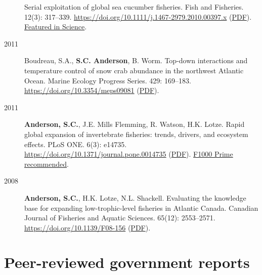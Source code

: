 \begin{description}
Serial exploitation of global sea cucumber fisheries. Fish and
Fisheries. 12(3): 317--339.
\url{https://doi.org/10.1111/j.1467-2979.2010.00397.x}
(\href{https://www.dropbox.com/s/d8id4zxe9xv6jau/Anderson_etal_2011_seacucumbers_with_supplement.pdf?dl=1}{PDF}).
\href{http://www.sciencemag.org/content/331/6014/129.1.full}{Featured in
Science}.
\item[2011]
Boudreau, S.A., \textbf{S.C. Anderson}, B. Worm. Top-down interactions
and temperature control of snow crab abundance in the northwest Atlantic
Ocean. Marine Ecology Progress Series. 429: 169--183.
\url{https://doi.org/10.3354/meps09081}
(\href{http://www.int-res.com/articles/meps_oa/m429p169.pdf}{PDF}).
\item[2011]
\textbf{Anderson, S.C.}, J.E. Mills Flemming, R. Watson, H.K. Lotze.
Rapid global expansion of invertebrate fisheries: trends, drivers, and
ecosystem effects. PLoS ONE. 6(3): e14735.
\url{https://doi.org/10.1371/journal.pone.0014735}
(\href{http://www.plosone.org/article/fetchObject.action?uri=info\%3Adoi\%2F10.1371\%2Fjournal.pone.0014735\&representation=PDF}{PDF}).
\href{https://f1000.com/prime/9542957}{F1000 Prime recommended}.
\item[2008]
\textbf{Anderson, S.C.}, H.K. Lotze, N.L. Shackell. Evaluating the
knowledge base for expanding low-trophic-level fisheries in Atlantic
Canada. Canadian Journal of Fisheries and Aquatic Sciences. 65(12):
2553--2571. \url{https://doi.org/10.1139/F08-156}
(\href{https://www.dropbox.com/s/b0la81jbqitib6u/Anderson_etal_2008_knowledge.pdf?dl=1}{PDF}).
\end{description}

\hypertarget{peer-reviewed-government-reports}{%
\section{Peer-reviewed government
reports}\label{peer-reviewed-government-reports}}

